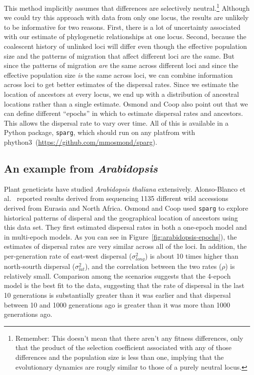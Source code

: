 This method implicitly assumes that differences are selectively
neutral.\footnote{Remember: This doesn't mean that there aren't any
  fitness differences, only that the product of the selection
  coefficient associated with any of those differences and the
  population size is less than one, implying that the evolutionary
  dynamics are rougly similar to those of a purely neutral locus.}
Although we could try this approach with data from only one locus, the
results are unlikely to be informative for two reasons. First, there
is a lot of uncertainty associated with our estimate of phylogenetic
relationships at one locus. Second, because the coalescent history of
unlinked loci will differ even though the effective population size
and the patterns of migration that affect different loci are the
same. But since the patterns of migration {\it are\/} the same across
different loci and since the effective population size {\it is\/} the
same across loci, we can combine information across loci to get better
estimates of the dispersal rates. Since we estimate the location of
ancestors at every locus, we end up with a distribution of ancestral
locations rather than a single estimate. Osmond and Coop also point
out that we can define different ``epochs'' in which to estimate
dispersal rates and ancestors. This allows the dispersal rate to vary
over time. All of this is available in a Python package, {\tt sparg},
which should run on any platfrom with
phython3~(\url{https://github.com/mmosmond/sparg}).

\subsection*{An example from {\it Arabidopsis}} 

Plant geneticists have studied {\it Arabidopsis thaliana\/}
extensively. Alonso-Blanco et al.~\cite{AlonsoBlanco-etal-2016}
reported results derived from sequencing 1135 different wild
accessions derived from Eurasia and North Africa. Osmond and Coop used
{\tt sparg} to explore historical patterns of disperal and the
geographical location of ancestors using this data set. They first
estimated dispersal rates in both a one-epoch model and in multi-epoch
models. As you can see in Figure~\ref{fig:arabidopsis-epochs}), the
estimates of dispersal rates are very similar across all of the
loci. In addition, the per-generation rate of east-west dispersal
($\sigma^2_{long}$) is about 10 times higher than north-sourth
dispersal ($\sigma^2_{lat}$), and the correlation between the two
rates ($\rho$) is relatively small. Comparison among the scenarios
suggests that the 4-epoch model is the best fit to the data,
suggesting that the rate of dispersal in the last 10 generations is
substantially greater than it was earlier and that dispersal between
10 and 1000 generations ago is greater than it was more than 1000
generations ago.

